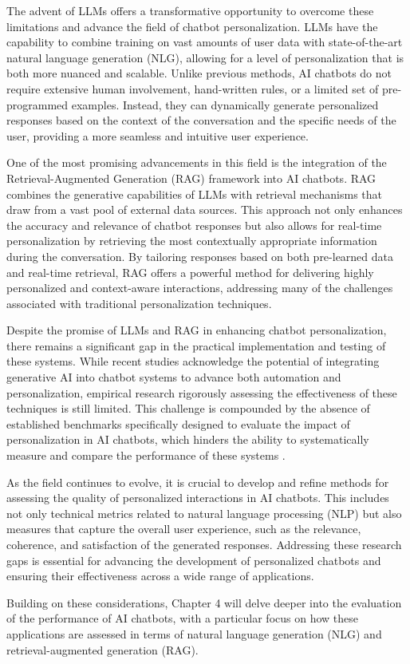 The advent of LLMs offers a transformative opportunity to overcome these limitations and advance the field of chatbot personalization. LLMs have the capability to combine training on vast amounts of user data with state-of-the-art natural language generation (NLG), allowing for a level of personalization that is both more nuanced and scalable. Unlike previous methods, AI chatbots do not require extensive human involvement, hand-written rules, or a limited set of pre-programmed examples. Instead, they can dynamically generate personalized responses based on the context of the conversation and the specific needs of the user, providing a more seamless and intuitive user experience.

One of the most promising advancements in this field is the integration of the Retrieval-Augmented Generation (RAG) framework into AI chatbots. RAG combines the generative capabilities of LLMs with retrieval mechanisms that draw from a vast pool of external data sources. This approach not only enhances the accuracy and relevance of chatbot responses but also allows for real-time personalization by retrieving the most contextually appropriate information during the conversation. By tailoring responses based on both pre-learned data and real-time retrieval, RAG offers a powerful method for delivering highly personalized and context-aware interactions, addressing many of the challenges associated with traditional personalization techniques.

Despite the promise of LLMs and RAG in enhancing chatbot personalization, there remains a significant gap in the practical implementation and testing of these systems. While recent studies acknowledge the potential of integrating generative AI into chatbot systems to advance both automation and personalization, empirical research rigorously assessing the effectiveness of these techniques is still limited. This challenge is compounded by the absence of established benchmarks specifically designed to evaluate the impact of personalization in AI chatbots, which hinders the ability to systematically measure and compare the performance of these systems \cite{verma2023generative}.

As the field continues to evolve, it is crucial to develop and refine methods for assessing the quality of personalized interactions in AI chatbots. This includes not only technical metrics related to natural language processing (NLP) but also measures that capture the overall user experience, such as the relevance, coherence, and satisfaction of the generated responses. Addressing these research gaps is essential for advancing the development of personalized chatbots and ensuring their effectiveness across a wide range of applications.

Building on these considerations, Chapter 4 will delve deeper into the evaluation of the performance of AI chatbots, with a particular focus on how these applications are assessed in terms of natural language generation (NLG) and retrieval-augmented generation (RAG).
